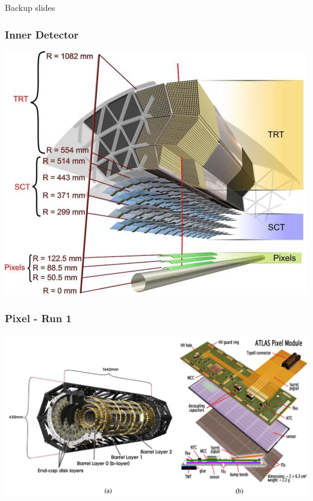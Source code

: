 \documentclass{beamer}
\begin{document}
\begin{frame}
\begin{center}
\huge{\color{dred}Backup slides}
\end{center}
\end{frame}
\begin{frame}
\frametitle{Inner Detector}
\centering
\includegraphics[width=.7\textwidth]{innerdetector_sideways}
\end{frame}

\begin{frame}
\frametitle{Pixel - Run 1}
\includegraphics[width=\textwidth]{Pixel_run1}
\end{frame}
\end{document}
